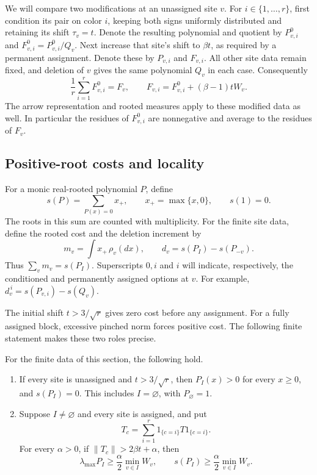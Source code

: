 We will compare two modifications at an unassigned site \(v\).
For \(i\in\{1,\ldots,r\}\), first condition its pair on color \(i\),
keeping both signs uniformly distributed and retaining its shift
\(\tau_v=t\).  Denote the resulting polynomial and quotient by
\(P^0_{v,i}\) and \(F^0_{v,i}=P^0_{v,i}/Q_v\).
Next increase that site's shift to \(\beta t\), as required by a
permanent assignment.  Denote these by \(P_{v,i}\) and \(F_{v,i}\).
All other site data remain fixed, and deletion of \(v\) gives the same
polynomial \(Q_v\) in each case.  Consequently
\begin{equation}
 \frac1r\sum_{i=1}^r F^0_{v,i}=F_v,\qquad
 F_{v,i}=F^0_{v,i}+(\beta-1)tW_v.
 \label{eq:poly-options}
\end{equation}
The arrow representation and rooted measures apply to these modified
data as well.  In particular the residues of \(F^0_{v,i}\) are
nonnegative and average to the residues of \(F_v\).

\subsection{Positive-root costs and locality}

For a monic real-rooted polynomial \(P\), define
\[
 s(P)=\sum_{P(x)=0}x_+,\qquad x_+=\max\{x,0\},
 \qquad s(1)=0.
\]
The roots in this sum are counted with multiplicity.
For the finite site data, define the rooted cost and the deletion
increment by
\begin{equation}
       m_v=\int x_+\,\rho_v(dx),\qquad
       d_v=s(P_I)-s(P_{-v}).
 \label{eq:poly-costs}
\end{equation}
Thus \(\sum_vm_v=s(P_I)\).
Superscripts \(0,i\) and \(i\) will indicate, respectively, the
conditioned and permanently assigned options at \(v\).  For example,
\(d_v^{\,i}=s(P_{v,i})-s(Q_v)\).

The initial shift \(t>3/\sqrt r\) gives zero cost before any assignment.
For a fully assigned block, excessive pinched norm forces positive cost.
The following finite statement makes these two roles precise.

\begin{lemma}
\label{lem:finite-cost-endpoints}
For the finite data of this section, the following hold.
\begin{enumerate}
\item If every site is unassigned and \(t>3/\sqrt r\), then
\(P_I(x)>0\) for every \(x\geq0\), and \(s(P_I)=0\). This includes
\(I=\varnothing\), with \(P_\varnothing=1\).
\item Suppose \(I\ne\varnothing\) and every site is assigned, and put
\[
 T_c=\sum_{i=1}^r 1_{\{c=i\}}T1_{\{c=i\}}.
\]
For every \(\alpha>0\), if \(\|T_c\|>2\beta t+\alpha\), then
\[
 \lambda_{\max}P_I\geq\frac\alpha2\min_{v\in I}W_v,
 \qquad
 s(P_I)\geq\frac\alpha2\min_{v\in I}W_v.
\]
\end{enumerate}
\end{lemma}

